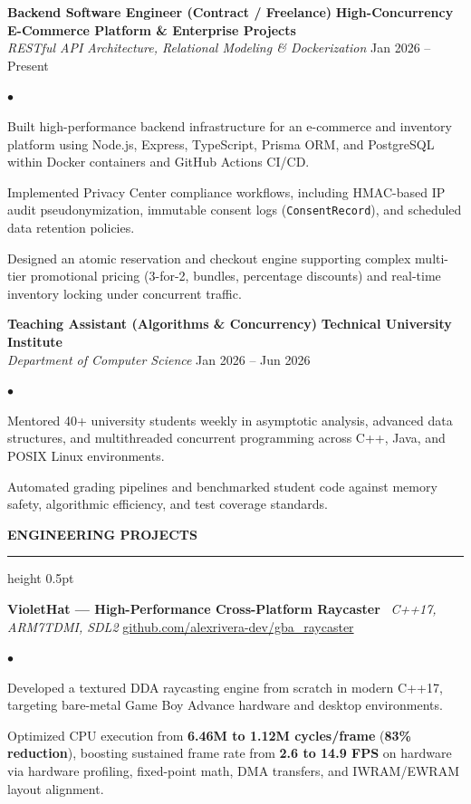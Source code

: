 \documentclass[10pt,letterpaper]{article}
\newcommand{\resumesection}[1]{%
  \vspace{2pt}%
  {\color{primary}\normalsize\bfseries\MakeUppercase{#1}}%
  \vspace{1pt}\hrule height 0.5pt\vspace{2pt}%
}
\renewenvironment{itemize}{%
  \begin{list}{\color{primary}$\bullet$}{%
    \setlength{\leftmargin}{1.1em}%
    \setlength{\itemsep}{0.5pt}%
    \setlength{\topsep}{1pt}%
    \setlength{\parsep}{0pt}%
    \setlength{\partopsep}{0pt}%
  }%
}{%
  \end{list}%
}
\begin{document}
\vspace{1.5pt}

\textbf{Backend Software Engineer (Contract / Freelance)} \hfill \textbf{High-Concurrency E-Commerce Platform \& Enterprise Projects} \\
\textit{RESTful API Architecture, Relational Modeling \& Dockerization} \hfill Jan 2026 -- Present
\begin{itemize}
    \item Built high-performance backend infrastructure for an e-commerce and inventory platform using Node.js, Express, TypeScript, Prisma ORM, and PostgreSQL within Docker containers and GitHub Actions CI/CD.
    \item Implemented Privacy Center compliance workflows, including HMAC-based IP audit pseudonymization, immutable consent logs (\texttt{ConsentRecord}), and scheduled data retention policies.
    \item Designed an atomic reservation and checkout engine supporting complex multi-tier promotional pricing (3-for-2, bundles, percentage discounts) and real-time inventory locking under concurrent traffic.
\end{itemize}

\vspace{1.5pt}

\textbf{Teaching Assistant (Algorithms \& Concurrency)} \hfill \textbf{Technical University Institute} \\
\textit{Department of Computer Science} \hfill Jan 2026 -- Jun 2026
\begin{itemize}
    \item Mentored 40+ university students weekly in asymptotic analysis, advanced data structures, and multithreaded concurrent programming across C++, Java, and POSIX Linux environments.
    \item Automated grading pipelines and benchmarked student code against memory safety, algorithmic efficiency, and test coverage standards.
\end{itemize}

\resumesection{Engineering Projects}

\textbf{VioletHat — High-Performance Cross-Platform Raycaster} \textbar\ \textit{C++17, ARM7TDMI, SDL2} \hfill \href{https://github.com/alexrivera-dev/gba_raycaster}{github.com/alexrivera-dev/gba\_raycaster}
\begin{itemize}
    \item Developed a textured DDA raycasting engine from scratch in modern C++17, targeting bare-metal Game Boy Advance hardware and desktop environments.
    \item Optimized CPU execution from \textbf{6.46M to 1.12M cycles/frame} (\textbf{83\% reduction}), boosting sustained frame rate from \textbf{2.6 to 14.9 FPS} on hardware via hardware profiling, fixed-point math, DMA transfers, and IWRAM/EWRAM layout alignment.
\end{itemize}
\end{document}
